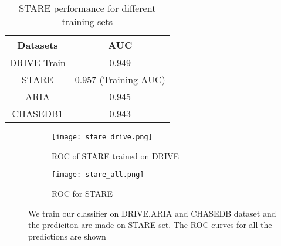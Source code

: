 \begin{table}
	\caption{STARE performance for different training sets}
	\centering
	\label{table:auccompare}
	\begin{tabular}{c c  }
		\toprule
		{Datasets} & {AUC}   \\ \hline
		
		DRIVE Train & 0.949 \\
		
		STARE& 0.957 (Training AUC)  \\
		
		ARIA & 0.945 \\
		
		CHASEDB1 & 0.943 \\
		
		\bottomrule
	\end{tabular}
\end{table}


\begin{figure}
	\centering
	\begin{subfigure}[b]{0.45\textwidth}
		\texttt{[image: stare\_drive.png]}
		\caption{ROC of STARE trained  on DRIVE}
		\label{fig:str}
	\end{subfigure}
	\begin{subfigure}[b]{0.45\textwidth}
		\texttt{[image: stare\_all.png]}
		\caption{ROC for STARE}
		\label{fig:str1}
	\end{subfigure}

	\caption[Cross training comparison for STARE dataset]{We train our classifier on DRIVE,ARIA and CHASEDB dataset and the prediciton are made on STARE set. The ROC curves for all the predictions are shown}
	\label{fig:comparestare}
\end{figure}